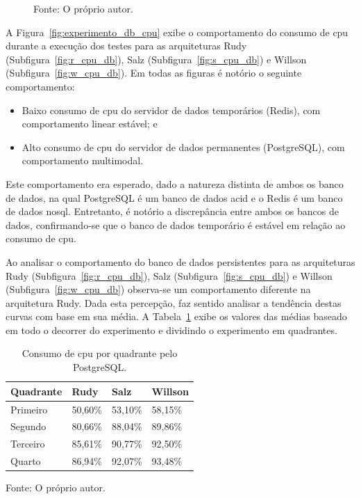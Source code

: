 \begin{figure}[htb!]
    Fonte: O próprio autor.
\end{figure}


A Figura~\ref{fig:experimento_db_cpu} exibe o comportamento do consumo de \ac{cpu} durante a execução dos testes para as arquiteturas Rudy (Subfigura~\ref{fig:r_cpu_db}), Salz (Subfigura~\ref{fig:s_cpu_db}) e Willson (Subfigura~\ref{fig:w_cpu_db}).
%
Em todas as figuras é notório o seguinte comportamento:

\begin{itemize}
 \item Baixo consumo de \ac{cpu} do servidor de dados temporários (Redis), com comportamento linear estável; e
 \item Alto consumo de \ac{cpu} do servidor de dados permanentes (PostgreSQL), com comportamento multimodal.
\end{itemize}

Este comportamento era esperado, dado a natureza distinta de ambos os banco de dados, na qual PostgreSQL é um banco de dados \ac{acid} e o Redis é um banco de dados \ac{nosql}.
%
Entretanto, é notório a discrepância entre ambos os bancos de dados, 
confirmando-se que o banco de dados temporário é estável em relação ao consumo de \ac{cpu}.

Ao analisar o comportamento do banco de dados persistentes para as arquiteturas Rudy (Subfigura~\ref{fig:r_cpu_db}), Salz (Subfigura~\ref{fig:s_cpu_db}) e Willson (Subfigura~\ref{fig:w_cpu_db}) observa-se um comportamento diferente na arquitetura Rudy.
%
Dada esta percepção, faz sentido analisar a tendência destas curvas com base em sua média.
%
A Tabela~\ref{tab:cpu_db_media_quadrantes} exibe os valores das médias baseado em todo o decorrer do experimento e dividindo o experimento em quadrantes.

\begin{table}[htb!]
\centering
\begin{adjustbox}{max width=\textwidth}
\caption{Consumo de \ac{cpu} por quadrante pelo PostgreSQL.}
\label{tab:cpu_db_media_quadrantes}
\begin{tabular}{l|l|l|l}

\hline \hline

Quadrante & Rudy    & Salz    & Willson \\ \hline \hline

Primeiro  & 50,60\% & 53,10\% & 58,15\% \\ \hline

Segundo   & 80,66\% & 88,04\% & 89,86\% \\ \hline

Terceiro  & 85,61\% & 90,77\% & 92,50\% \\ \hline

Quarto    & 86,94\% & 92,07\% & 93,48\% \\ \hline \hline

\end{tabular}

\end{adjustbox}

Fonte: O próprio autor.
\end{table}

